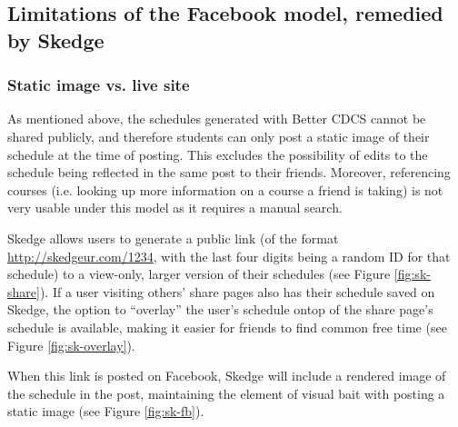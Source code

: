 \subsection{Limitations of the Facebook model, remedied by Skedge}

  \subsubsection{Static image vs. live site}

    As mentioned above, the schedules generated with Better CDCS cannot be shared publicly, and therefore students can only post a static image of their schedule at the time of posting. This excludes the possibility of edits to the schedule being reflected in the same post to their friends. Moreover, referencing courses (i.e. looking up more information on a course a friend is taking) is not very usable under this model as it requires a manual search.

    Skedge allows users to generate a public link (of the format \url{http://skedgeur.com/1234}, with the last four digits being a random ID for that schedule) to a view-only, larger version of their schedules (see Figure \ref{fig:sk-share}). If a user visiting others' share pages also has their schedule saved on Skedge, the option to ``overlay'' the user's schedule ontop of the share page's schedule is available, making it easier for friends to find common free time (see Figure \ref{fig:sk-overlay}).

    When this link is posted on Facebook, Skedge will include a rendered image of the schedule in the post, maintaining the element of visual bait with posting a static image (see Figure \ref{fig:sk-fb}).

